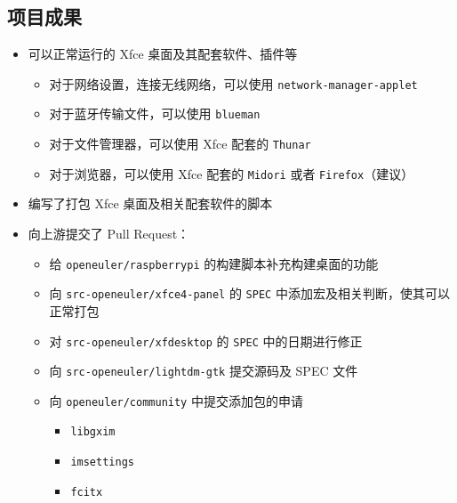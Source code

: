 \documentclass[letterpaper,12pt]{article}
\newcommand\link[1]{\href{#1}{\color{black}\faLink}}
\begin{document}
\subsection{项目成果}
    \begin{itemize}
        \item 可以正常运行的 Xfce 桌面及其配套软件、插件等
            \begin{itemize}
                \item 对于网络设置，连接无线网络，可以使用 \verb!network-manager-applet!
                \item 对于蓝牙传输文件，可以使用 \verb!blueman!
                \item 对于文件管理器，可以使用 Xfce 配套的 \verb!Thunar!
                \item 对于浏览器，可以使用 Xfce 配套的 \verb!Midori! 或者 \verb!Firefox!（建议）
            \end{itemize}
        \item 编写了打包 Xfce 桌面及相关配套软件的脚本 \link{https://github.com/dragonjacson/summer2020_openeuler/blob/master/scripts/buildall.sh}
        \item 向上游提交了 Pull Request：
            \begin{itemize}
                \item 给 \verb!openeuler/raspberrypi! 的构建脚本补充构建桌面的功能 \link{https://gitee.com/openeuler/raspberrypi/pulls/23}
                \item 向 \verb!src-openeuler/xfce4-panel! 的 \verb!SPEC! 中添加宏及相关判断，使其可以正常打包 \link{https://gitee.com/src-openeuler/xfdesktop/pulls/2}
                \item 对 \verb!src-openeuler/xfdesktop! 的 \verb!SPEC! 中的日期进行修正 \link{https://gitee.com/src-openeuler/xfce4-panel/pulls/2}
                \item 向 \verb!src-openeuler/lightdm-gtk! 提交源码及 SPEC 文件 \link{https://gitee.com/src-openeuler/lightdm-gtk/pulls/1}
                \item 向 \verb!openeuler/community! 中提交添加包的申请 \link{https://gitee.com/openeuler/community/pulls/1133}
                \begin{itemize}
                    \item \verb!libgxim! \link{https://gitee.com/raspi-oo/libgxim}
                    \item \verb!imsettings! \link{https://gitee.com/raspi-oo/imsettings}
                    \item \verb!fcitx! \link{https://gitee.com/raspi-oo/fcitx}

\end{itemize}
\end{itemize}
\end{itemize}
\end{document}
